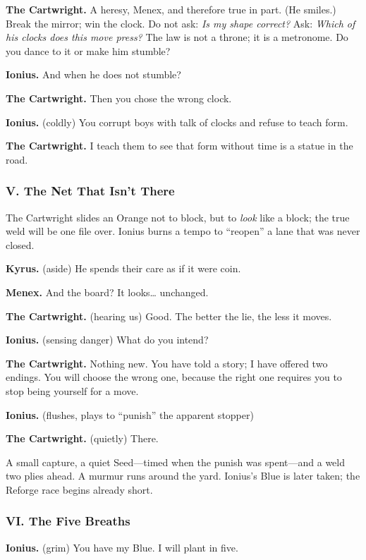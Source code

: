 \documentclass[11pt]{article}
\begin{document}
\noindent\textbf{The Cartwright.} A heresy, Menex, and therefore true in part. (He smiles.) Break the mirror; win the clock. Do not ask: \emph{Is my shape correct?} Ask: \emph{Which of his clocks does this move press?} The law is not a throne; it is a metronome. Do you dance to it or make him stumble?

\noindent\textbf{Ionius.} And when he does not stumble?

\noindent\textbf{The Cartwright.} Then you chose the wrong clock.

\noindent\textbf{Ionius.} (coldly) You corrupt boys with talk of clocks and refuse to teach form.

\noindent\textbf{The Cartwright.} I teach them to see that form without time is a statue in the road.

\medskip
\subsubsection*{V. The Net That Isn’t There}
The Cartwright slides an Orange not to block, but to \emph{look} like a block; the true weld will be one file over. Ionius burns a tempo to “reopen” a lane that was never closed.

\noindent\textbf{Kyrus.} (aside) He spends their care as if it were coin.

\noindent\textbf{Menex.} And the board? It looks… unchanged.

\noindent\textbf{The Cartwright.} (hearing us) Good. The better the lie, the less it moves.

\noindent\textbf{Ionius.} (sensing danger) What do you intend?

\noindent\textbf{The Cartwright.} Nothing new. You have told a story; I have offered two endings. You will choose the wrong one, because the right one requires you to stop being yourself for a move.

\noindent\textbf{Ionius.} (flushes, plays to “punish” the apparent stopper)

\noindent\textbf{The Cartwright.} (quietly) There.

A small capture, a quiet Seed—timed when the punish was spent—and a weld two plies ahead. A murmur runs around the yard. Ionius’s Blue is later taken; the Reforge race begins already short.

\medskip
\subsubsection*{VI. The Five Breaths}
\noindent\textbf{Ionius.} (grim) You have my Blue. I will plant in five.
\end{document}
